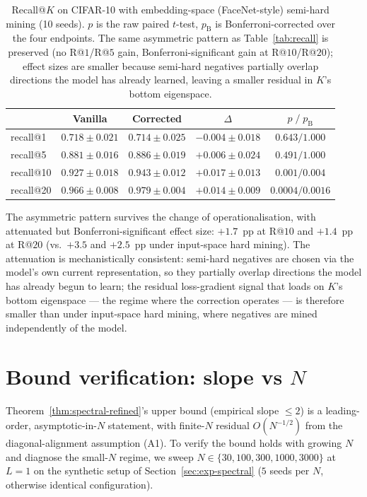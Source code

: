 \documentclass{article}
\begin{document}
\begin{table}[!htbp]
\centering
\small
\caption{Recall@$K$ on CIFAR-10 with embedding-space (FaceNet-style)
semi-hard mining (10 seeds). $p$ is the raw paired $t$-test,
$p_{\text{B}}$ is Bonferroni-corrected over the four endpoints. The
same asymmetric pattern as Table~\ref{tab:recall} is preserved
(no R@$1$/R@$5$ gain, Bonferroni-significant gain at R@$10$/R@$20$);
effect sizes are smaller because semi-hard negatives partially overlap
directions the model has already learned, leaving a smaller residual
in $K$'s bottom eigenspace.}
\label{tab:recall-semihard}
\begin{tabular}{lcccc}
\toprule
& Vanilla & Corrected & $\Delta$ & $p \;/\; p_{\text{B}}$ \\
\midrule
recall@1  & $0.718 \pm 0.021$ & $0.714 \pm 0.025$ & $-0.004 \pm 0.018$ & $0.643 / 1.000$ \\
recall@5  & $0.881 \pm 0.016$ & $0.886 \pm 0.019$ & $+0.006 \pm 0.024$ & $0.491 / 1.000$ \\
recall@10 & $0.927 \pm 0.018$ & $0.943 \pm 0.012$ & $\mathbf{+0.017 \pm 0.013}$ & $\mathbf{0.001 / 0.004}$ \\
recall@20 & $0.966 \pm 0.008$ & $0.979 \pm 0.004$ & $\mathbf{+0.014 \pm 0.009}$ & $\mathbf{0.0004 / 0.0016}$ \\
\bottomrule
\end{tabular}
\end{table}

The asymmetric pattern survives the change of operationalisation, with
attenuated but Bonferroni-significant effect size: $+1.7$~pp at R@$10$
and $+1.4$~pp at R@$20$ (vs.\ $+3.5$ and $+2.5$~pp under input-space
hard mining). The
attenuation is mechanistically consistent: semi-hard negatives are
chosen via the model's own current representation, so they partially
overlap directions the model has already begun to learn; the residual
loss-gradient signal that loads on $K$'s bottom eigenspace --- the
regime where the correction operates --- is therefore smaller than
under input-space hard mining, where negatives are mined independently
of the model.

\section{Bound verification: slope vs $N$}
\label{app:bound}

Theorem~\ref{thm:spectral-refined}'s upper bound (empirical slope
$\leq 2$) is a leading-order, asymptotic-in-$N$ statement, with
finite-$N$ residual $O(N^{-1/2})$ from the diagonal-alignment
assumption (A1). To verify the bound holds with growing $N$ and
diagnose the small-$N$ regime, we sweep
$N \in \{30, 100, 300, 1000, 3000\}$ at $L = 1$ on the synthetic
setup of Section~\ref{sec:exp-spectral} ($5$ seeds per $N$, otherwise
identical configuration).
\end{document}
